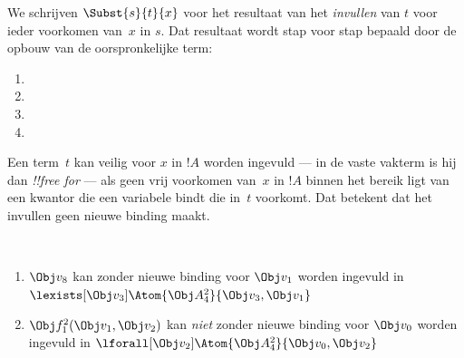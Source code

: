\documentclass[../../../include/open-logic-section]{subfiles}
\begin{document}


\begin{defn}
We schrijven $\Subst{s}{t}{x}$ voor het resultaat van het
\emph{invullen} van $t$ voor ieder voorkomen van~$x$ in $s$. Dat
resultaat wordt stap voor stap bepaald door de opbouw van de oorspronkelijke term:
\begin{enumerate}
\item {}

\item {}

\item {}

\item{}
\end{enumerate}
\end{defn}

\begin{defn}
Een term~$t$ kan veilig voor $x$ in $!A$ worden ingevuld — in de vaste
vakterm is hij dan \emph{!!{free for}} — als geen vrij voorkomen van~$x$
in $!A$ binnen het bereik ligt van een kwantor die een variabele bindt
die in~$t$ voorkomt. Dat betekent dat het invullen geen nieuwe binding maakt.
\end{defn}

\begin{ex} ~
\begin{enumerate}
\item $\Obj v_8$ kan zonder nieuwe binding voor $\Obj v_1$ worden
  ingevuld in $\lexists[\Obj
  v_3]\Atom{\Obj A^2_4}{\Obj v_3,\Obj v_1}$

\item $\Obj f^2_1(\Obj v_1, \Obj v_2)$ kan \emph{niet} zonder nieuwe
  binding voor $\Obj v_0$ worden ingevuld in
  $\lforall[\Obj v_2]\Atom{\Obj A^2_4}{\Obj v_0,\Obj v_2}$
\end{enumerate}
\end{ex}
\end{document}
